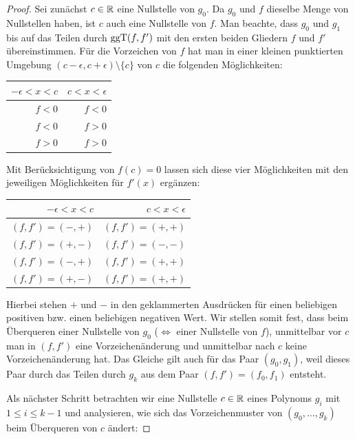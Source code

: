 \documentclass[11pt]{article}
\numberwithin{equation}{section}
\begin{document}
\begin{proof}
	Sei zunächst $c \in \mathbb{R}$ eine Nullstelle von $g_0$. Da $g_0$ und $f$ dieselbe Menge von Nullstellen haben, ist $c$ auch eine Nullstelle von $f$. Man beachte, dass $g_0$ und $g_1$ bis auf das Teilen durch $\operatorname{ggT}(f,f')$ mit den ersten beiden Gliedern $f$ und $f'$ übereinstimmen. Für die Vorzeichen von $f$ hat man in einer kleinen punktierten Umgebung $(c-\epsilon,c+\epsilon) \setminus \{c\}$ von $c$ die folgenden Möglichkeiten:
	\begin{center} 
	\begin{tabular}{r|r}
		$-\epsilon < x < c$ & $c < x < \epsilon$ 
		\\ \hline \hline 
		$f< 0$ & $f< 0$
		\\ \hline $f< 0$ & $f>0$
		\\ \hline $f>0$ & $f>0$
		\end{tabular} 
	\end{center} 
	Mit Berücksichtigung von $f(c) =0$  lassen sich diese vier Möglichkeiten mit den jeweiligen Möglichkeiten für $f'(x)$ ergänzen: 
	\begin{center} 
	\begin{tabular}{r|r}
		$-\epsilon < x < c$ & $c < x < \epsilon$ 
		\\ \hline \hline 
		$(f,f') =(-,+)$  & $(f,f') = (+,+)$ 		
		\\ $(f,f') = (+,-) $ & $(f,f') = (-,-)$
		\\ \hline $(f,f') = (-, +)$ & $(f,f') = (+,+)$ 
		\\ \hline $(f,f') = (+, -) $ & $(f,f') = (+,+)$
	\end{tabular} 
\end{center} 
Hierbei stehen $+$ und $-$ in den geklammerten Ausdrücken für einen beliebigen positiven bzw. einen beliebigen negativen Wert. Wir stellen somit fest, dass beim Überqueren einer Nullstelle von $g_0$ ($\Leftrightarrow$ einer Nullstelle von $f$), unmittelbar vor $c$ man in $(f,f')$ eine Vorzeichenänderung und unmittelbar nach $c$ keine Vorzeichenänderung hat. Das Gleiche gilt auch für das Paar $(g_0,g_1)$, weil dieses Paar durch das Teilen durch $g_k$ aus dem Paar $(f,f') = (f_0,f_1)$ entsteht. 
	
Als nächster Schritt betrachten wir eine Nullstelle $c \in \mathbb{R}$ eines Polynoms $g_i$ mit $1 \le i  \le k-1$ und analysieren, wie sich das Vorzeichenmuster von $(g_0,\ldots,g_k)$ beim Überqueren von $c$ ändert: 


\end{proof}
\end{document}

